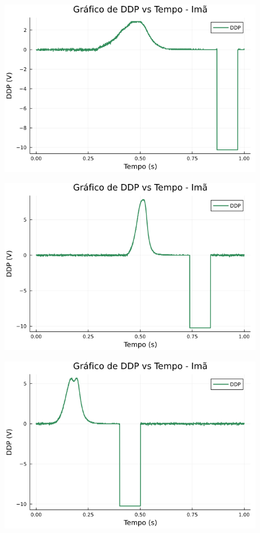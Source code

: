 \begin{center}
\begin{multicols}{2}
\begin{figure}[H]
    \centering
    \includegraphics[width=1.0\linewidth]{figuras/grafico_dados1_F0013CH1.png}
\end{figure}

\begin{figure}[H]
    \centering
    \includegraphics[width=1.0\linewidth]{figuras/grafico_dados1_F0014CH1.png}
\end{figure}

\begin{figure}[H]
    \centering
    \includegraphics[width=1.0\linewidth]{figuras/grafico_dados1_F0016CH1.png}
\end{figure}


\end{multicols}
\end{center}
